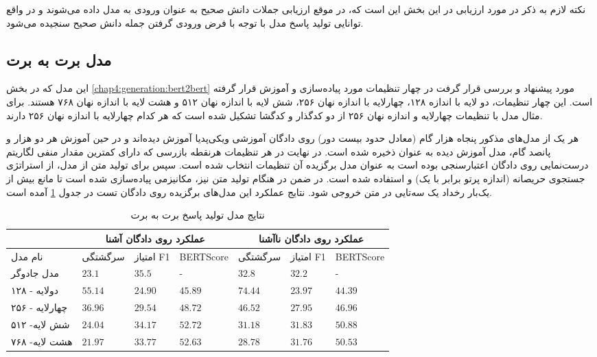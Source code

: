 نکته لازم به ذکر در مورد ارزیابی در این بخش این است که، در موقع ارزیابی جملات دانش صحیح به عنوان ورودی به مدل داده‌ می‌شوند و در واقع توانایی تولید پاسخ مدل با توجه با فرض ورودی گرفتن جمله دانش صحیح سنجیده می‌شود. 

\subsection{مدل برت به برت}
این مدل که در بخش 
\ref{chap4:generation:bert2bert}
مورد پیشنهاد و بررسی قرار گرفت در چهار تنظیمات مورد پیاده‌سازی و آموزش قرار گرفته است. این چهار تنظیمات، دو لایه با اندازه ۱۲۸، چهارلایه با اندازه نهان ۲۵۶، شش لایه با اندازه نهان ۵۱۲ و هشت لایه با اندازه نهان ۷۶۸ هستند. برای مثال مدل با تنظیمات چهارلایه و اندازه نهان ۲۵۶ از دو کدگذار و کدگشا تشکیل شده است که هر کدام چهارلایه با اندازه نهان ۲۵۶ دارند. 

هر یک از مدل‌های مذکور پنجاه هزار گام (معادل حدود بیست دور) روی دادگان آموزشی ویکی‌پدیا آموزش دیده‌اند و در حین آموزش هر دو هزار و پانصد گام، مدل آموزش دیده به عنوان 
ذخیره شده است. در نهایت  در هر تنظیمات  هرنقطه‌ بازرسی که دارای کمترین مقدار منفی لگاریتم درست‌نمایی روی دادگان اعتبارسنجی بوده است به عنوان مدل برگزیده آن تنظیمات انتخاب شده است. سپس برای تولید متن از مدل، از استراتژی
جستجوی حریصانه (اندازه پرتو برابر با یک)  و  
استفاده شده است.  در ضمن در هنگام تولید متن نیز، مکانیزمی پیاده‌سازی شده است تا مانع بیش از یک‌بار رخداد یک سه‌تایی در متن خروجی شود. 
نتایج عملکرد این مدل‌های برگزیده روی دادگان تست در جدول 
\ref{table:generation:bert2bert:beam1}
 آمده است.
\begin{table}[htb]
	\caption{ نتایج مدل تولید پاسخ برت به برت}
	\label{table:generation:bert2bert:beam1}
	\begin{tabular}{|l|l|l|l|l|l|l|}
		\hline
		& \multicolumn{3}{c|}{عملکرد روی دادگان آشنا}           & \multicolumn{3}{c|}{عملکرد روی دادگان نا‌آشنا}         \\ \hline
		نام مدل        & سرگشتگی          & امتیاز F1       & BERTScore        & سرگشتگی          & امتیاز F1        & BERTScore        \\ \hline
		مدل جادوگر     & $23.1$           & $\mathbf{35.5}$ & -                & $32.8$           & $32.2$           & -                \\ \hline
		دولایه - ۱۲۸   & $55.14$          & $24.90$         & $45.89$          & $74.44$          & $23.97$          & $44.39$          \\ \hline
		چهارلایه - ۲۵۶ & $36.96$          & $29.54$         & $48.72$          & $46.52$          & $27.95$          & $46.96$          \\ \hline
		شش لایه- ۵۱۲   & $24.04$          & $34.17$         & $\mathbf{52.72}$ & $31.18$          & $\mathbf{31.83}$ & $\mathbf{50.88}$ \\ \hline
		هشت لایه- ۷۶۸  & $\mathbf{21.97}$ & $33.77$         & $52.63$          & $\mathbf{28.78}$ & $31.76$          & $50.53$          \\ \hline
	\end{tabular}
\end{table}


